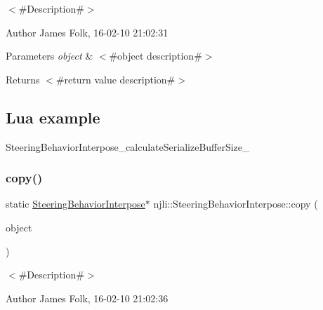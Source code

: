 $<$\#\+Description\#$>$ 

\begin{DoxyAuthor}{Author}
James Folk, 16-\/02-\/10 21\+:02\+:31
\end{DoxyAuthor}

\begin{DoxyParams}{Parameters}
{\em object} & $<$\#object description\#$>$\\
\hline
\end{DoxyParams}
\begin{DoxyReturn}{Returns}
$<$\#return value description\#$>$
\end{DoxyReturn}
\hypertarget{classnjli_1_1_steering_behavior_wander_ex1}{}\subsection{Lua example}\label{classnjli_1_1_steering_behavior_wander_ex1}

\begin{DoxyCodeInclude}
\end{DoxyCodeInclude}
Steering\+Behavior\+Interpose\+\_\+calculate\+Serialize\+Buffer\+Size\+\_\+ \mbox{\label{classnjli_1_1_steering_behavior_interpose_a783a835d9c0bbbe7b99426667ac9afd5}} 
\subsubsection{\texorpdfstring{copy()}{copy()}}
{\footnotesize\ttfamily static \mbox{\hyperlink{classnjli_1_1_steering_behavior_interpose}{Steering\+Behavior\+Interpose}}$\ast$ njli\+::\+Steering\+Behavior\+Interpose\+::copy (\begin{DoxyParamCaption}\item[{const \mbox{\hyperlink{classnjli_1_1_steering_behavior_interpose}{Steering\+Behavior\+Interpose}} \&}]{object }\end{DoxyParamCaption})\hspace{0.3cm}{\ttfamily [static]}}



$<$\#\+Description\#$>$ 

\begin{DoxyAuthor}{Author}
James Folk, 16-\/02-\/10 21\+:02\+:36
\end{DoxyAuthor}

